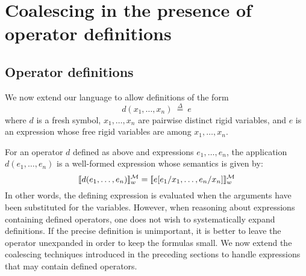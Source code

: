 \documentclass{easychair}
\newcommand{\tlaplus}{\mbox{TLA\kern -.35ex$^+$}\xspace}
\newcommand{\sem}[1]{\ensuremath{[\![ #1 ]\!]}}
\newcommand{\MM}{\mathcal{M}}
\newcommand{\OO}{\mathcal{O}}
\newcommand{\edmargin}[2]{\marginpar{\raggedright\footnotesize\color{red}#1: #2}}
\newcommand{\edmargin}[2]{}
\def\llnote{\ednote{LL}}
\def\smmargin{\edmargin{SM}}
\def\tlnote{\ednote{TL}}
\def\jkmargin{\edmargin{JK}}
\let\notla\relax
\newcommand{\deq}{\mathrel{\stackrel{\scriptscriptstyle\Delta}{=}}}
\def\E{\exists\,}
\begin{document}
\section{Coalescing in the presence of operator definitions}
\label{sec:leibnizing}

\subsection{Operator definitions}
\label{sec:definitions}


We now extend our language to allow definitions of the form
\[
  d(x_1,\ldots,x_n)\ \deq\ e
\]
where $d$ is a fresh symbol,
$x_1,\ldots,x_n$ are pairwise distinct rigid
variables, and $e$ is an expression whose free rigid variables are among
$x_1,\ldots,x_n$.


For an operator $d$ defined as above and expressions $e_1,\ldots,e_n$, the
application $d(e_1,\ldots,e_n)$ is a well-formed expression whose semantics is
given by:
\[\notla
  \sem{d(e_1,\ldots,e_n)}^{\MM}_w =
  \sem{e[e_1/x_1, \ldots, e_n/x_n]}^{\MM}_w
\] In other words, the defining expression is evaluated when the
arguments have been substituted for the variables.  However, when
reasoning about expressions containing defined operators, one does not
wish to systematically expand definitions.  If the precise definition
is unimportant, it is better to leave the operator unexpanded in order
to keep the formulas small.  We now extend the coalescing techniques
introduced in the preceding sections to handle expressions that may
contain defined operators.
\end{document}
